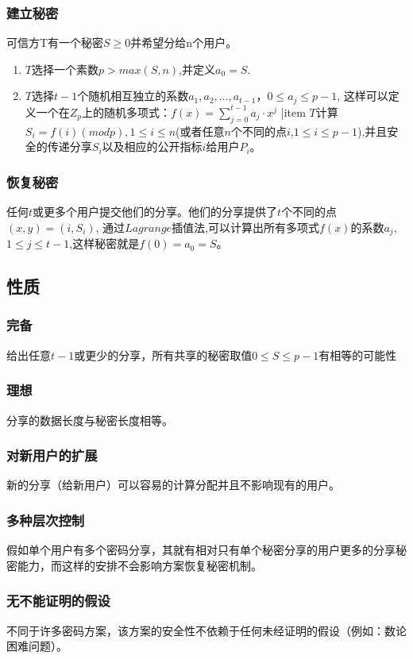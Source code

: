 \documentclass[11pt,a4paper]{article}
\begin{document}
\subsubsection{建立秘密} 可信方T有一个秘密$S\ge0$并希望分给n个用户。
\begin{enumerate}[1)]
\item $T$选择一个素数$p > max(S,n)$,并定义$a_0 = S$.
\item $T$选择$t-1$个随机相互独立的系数$a_1,a_2,\dots,a_{t-1}$，$0 \le a_j \le p-1$,
这样可以定义一个在$Z_p$上的随机多项式：$f(x)= \sum_{j=0}^{t-1}a_j· x^j$
|item $T$计算$S_i = f(i)(mod p) , 1 \le i \le n$(或者任意$n$个不同的点$i$,$1 \le i \le p-1$),并且安全的传递分享$S_i$以及相应的公开指标$i$给用户$P_i$。
\end{enumerate}

\subsubsection{恢复秘密} 任何$t$或更多个用户提交他们的分享。他们的分享提供了$t$个不同的点$(x,y)=(i, S_i)$, 通过$Lagrange$插值法,可以计算出所有多项式$f(x)$的系数$a_j$,$1 \le j \le t-1$,这样秘密就是$f(0)=a_0=S$。
\subsection{性质}
\subsubsection{完备} 给出任意$t-1$或更少的分享，所有共享的秘密取值$0\le S \le p-1$有相等的可能性
\subsubsection{理想}分享的数据长度与秘密长度相等。
\subsubsection{对新用户的扩展}新的分享（给新用户）可以容易的计算分配并且不影响现有的用户。
\subsubsection{多种层次控制}假如单个用户有多个密码分享，其就有相对只有单个秘密分享的用户更多的分享秘密能力，而这样的安排不会影响方案恢复秘密机制。
\subsubsection{无不能证明的假设}不同于许多密码方案，该方案的安全性不依赖于任何未经证明的假设（例如：数论困难问题）。
\end{document}
